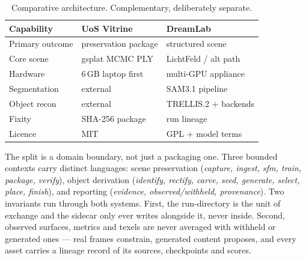 \begin{table}[t]
\centering\small
\caption{Comparative architecture. Complementary, deliberately separate.
}
\label{tab:compare}
\setlength{\tabcolsep}{3pt}
\begin{tabular}{@{}p{}p{}p{}@{}}
\toprule
Capability & UoS Vitrine & DreamLab \\
\midrule
Primary outcome & preservation package & structured scene \\
Core scene & gsplat MCMC PLY & LichtFeld / alt path \\
Hardware & 6\,GB laptop first & multi-GPU appliance \\
Segmentation & external & SAM3.1 pipeline \\
Object recon & external & TRELLIS.2 + backends \\
Fixity & SHA-256 package & run lineage \\
Licence & MIT & GPL + model terms \\
\bottomrule
\end{tabular}
\end{table}

The split is a domain boundary, not just a packaging one. Three bounded contexts carry
distinct languages: scene preservation (\emph{capture, ingest, sfm, train, package,
verify}), object derivation (\emph{identify, rectify, carve, seed, generate, select, place,
finish}), and reporting (\emph{evidence, observed/withheld, provenance}). Two invariants
run through both systems. First, the run-directory is the unit of exchange and the sidecar
only ever writes alongside it, never inside. Second, observed surfaces, metrics and texels
are never averaged with withheld or generated ones --- real frames constrain, generated
content proposes, and every asset carries a lineage record of its sources, checkpoints and
scores.
